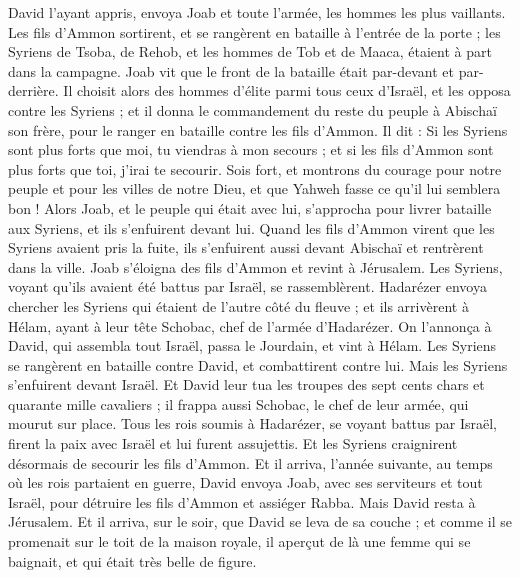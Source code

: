 \begin{multicols}{2}
David l’ayant appris, envoya Joab et toute l'armée, les hommes les plus vaillants.
Les fils d’Ammon sortirent, et se rangèrent en bataille à l'entrée de la porte ; les Syriens de Tsoba, de Rehob, et les hommes de Tob et de Maaca, étaient à part dans la campagne.
Joab vit que le front de la bataille était par-devant et par-derrière. Il choisit alors des hommes d'élite parmi tous ceux d'Israël, et les opposa contre les Syriens ;
et il donna le commandement du reste du peuple à Abischaï son frère, pour le ranger en bataille contre les fils d’Ammon.
Il dit : Si les Syriens sont plus forts que moi, tu viendras à mon secours ; et si les fils d’Ammon sont plus forts que toi, j'irai te secourir.
Sois fort, et montrons du courage pour notre peuple et pour les villes de notre Dieu, et que Yahweh fasse ce qu'il lui semblera bon !
Alors Joab, et le peuple qui était avec lui, s'approcha pour livrer bataille aux Syriens, et ils s'enfuirent devant lui.
Quand les fils d’Ammon virent que les Syriens avaient pris la fuite, ils s'enfuirent aussi devant Abischaï et rentrèrent dans la ville. Joab s’éloigna des fils d’Ammon et revint à Jérusalem.
Les Syriens, voyant qu'ils avaient été battus par Israël, se rassemblèrent.
Hadarézer envoya chercher les Syriens qui étaient de l’autre côté du fleuve ; et ils arrivèrent à Hélam, ayant à leur tête Schobac, chef de l'armée d’Hadarézer.
On l’annonça à David, qui assembla tout Israël, passa le Jourdain, et vint à Hélam. Les Syriens se rangèrent en bataille contre David, et combattirent contre lui.
Mais les Syriens s'enfuirent devant Israël. Et David leur tua les troupes des sept cents chars et quarante mille cavaliers ; il frappa aussi Schobac, le chef de leur armée, qui mourut sur place.
Tous les rois soumis à Hadarézer, se voyant battus par Israël, firent la paix avec Israël et lui furent assujettis. Et les Syriens craignirent désormais de secourir les fils d’Ammon.
\VerseOne{}Et il arriva, l’année suivante, au temps où les rois partaient en guerre, David envoya Joab, avec ses serviteurs et tout Israël, pour détruire les fils d’Ammon et assiéger Rabba. Mais David resta à Jérusalem.
Et il arriva, sur le soir, que David se leva de sa couche ; et comme il se promenait sur le toit de la maison royale, il aperçut de là une femme qui se baignait, et qui était très belle de figure.

\end{multicols}
